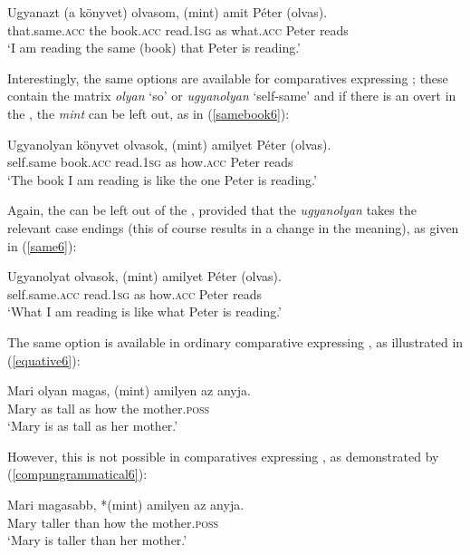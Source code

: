 \ea \gll	Ugyanazt	(a	könyvet)	olvasom,	(mint)	amit	Péter (olvas). \label{ugyanazt}\\
that.same.\textsc{acc}	\phantom{(}the	book.\textsc{acc}	read.\textsc{1sg} \phantom{(}as	what.\textsc{acc} Peter \phantom{(}reads\\
\glt `I am reading the same (book) that Peter is reading.'
\z

Interestingly, the same options are available for comparatives expressing ; these contain the matrix   \textit{olyan} `so' or \textit{ugyanolyan} `self-same' and if there is an overt  in the , the  \textit{mint} can be left out, as in (\ref{samebook6}):

\ea \gll	Ugyanolyan	könyvet	olvasok,	(mint)	amilyet	Péter	(olvas). \label{samebook6}\\
self.same	book.\textsc{acc}	read.\textsc{1sg} \phantom{(}as	how.\textsc{acc} Peter \phantom{(}reads\\
\glt `The book I am reading is like the one Peter is reading.'
\z
	
Again, the  can be left out of the , provided that the  \textit{ugyanolyan} takes the relevant case endings (this of course results in a change in the meaning), as given in (\ref{same6}):

\ea \gll	Ugyanolyat	olvasok,	(mint)	amilyet	Péter	(olvas). \label{same6}\\
self.same.\textsc{acc}	read.\textsc{1sg} \phantom{(}as	how.\textsc{acc} Peter \phantom{(}reads\\
\glt `What I am reading is like what Peter is reading.'
\z
	
The same option is available in ordinary comparative  expressing , as illustrated in (\ref{equative6}):

\ea \gll	Mari	olyan	magas,	(mint)	amilyen	az	anyja. \label{equative6}\\
Mary	as	tall \phantom{(}as	how	the	mother.\textsc{poss}\\
\glt `Mary is as tall as her mother.'
\z
	
However, this is not possible in comparatives expressing , as demonstrated by (\ref{compungrammatical6}):

\ea \gll	Mari magasabb, *(mint)	amilyen	az	anyja. \label{compungrammatical6}\\
Mary	taller \phantom{*(}than	how	the	mother.\textsc{poss}\\
\glt `Mary is taller than her mother.'
\z
	
